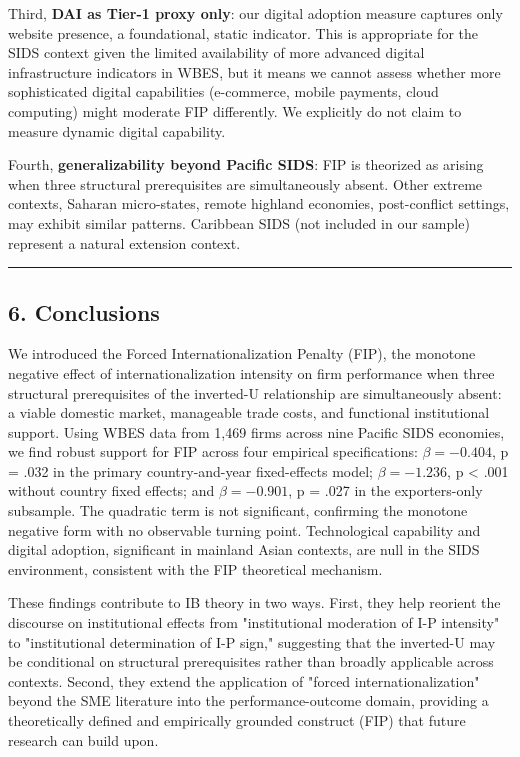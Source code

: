 \documentclass[12pt,a4paper]{article}
\begin{document}
Third, \textbf{DAI as Tier-1 proxy only}: our digital adoption measure
captures only website presence, a foundational, static indicator. This
is appropriate for the SIDS context given the limited availability of
more advanced digital infrastructure indicators in WBES, but it means we
cannot assess whether more sophisticated digital capabilities
(e-commerce, mobile payments, cloud computing) might moderate FIP
differently. We explicitly do not claim to measure dynamic digital
capability.

Fourth, \textbf{generalizability beyond Pacific SIDS}: FIP is theorized
as arising when three structural prerequisites are simultaneously
absent. Other extreme contexts, Saharan micro-states, remote highland
economies, post-conflict settings, may exhibit similar patterns.
Caribbean SIDS (not included in our sample) represent a natural
extension context.

\begin{center}\rule{0.5\linewidth}{0.5pt}\end{center}

\hypertarget{6-conclusions}{%
\subsection{6. Conclusions}\label{6-conclusions}}

We introduced the Forced Internationalization Penalty (FIP), the
monotone negative effect of internationalization intensity on firm
performance when three structural prerequisites of the inverted-U
relationship are simultaneously absent: a viable domestic market,
manageable trade costs, and functional institutional support. Using WBES
data from 1,469 firms across nine Pacific SIDS economies, we find robust
support for FIP across four empirical specifications:
\(\beta = −0.404\), p = .032 in the primary country-and-year
fixed-effects model; \(\beta = −1.236\), p \textless{} .001 without
country fixed effects; and \(\beta = −0.901\), p = .027 in the
exporters-only subsample. The quadratic term is not significant,
confirming the monotone negative form with no observable turning point.
Technological capability and digital adoption, significant in mainland
Asian contexts, are null in the SIDS environment, consistent with the
FIP theoretical mechanism.

These findings contribute to IB theory in two ways. First, they help
reorient the discourse on institutional effects from "institutional
moderation of I-P intensity" to "institutional determination of I-P
sign," suggesting that the inverted-U may be conditional on structural
prerequisites rather than broadly applicable across contexts. Second,
they extend the application of "forced internationalization" beyond the
SME literature into the performance-outcome domain, providing a
theoretically defined and empirically grounded construct (FIP) that
future research can build upon.
\end{document}

